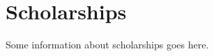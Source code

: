 \newpage
\section*{Scholarships}
\label{scholarships}
\pagestyle{cropmarksstyle}

Some information about scholarships goes here.
